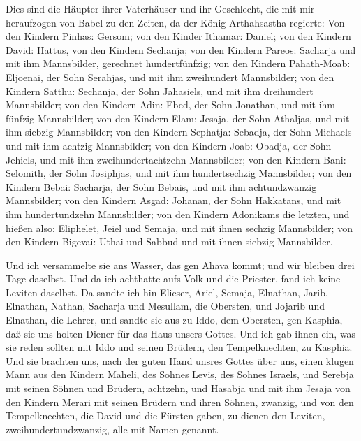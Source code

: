  Dies sind die Häupter ihrer Vaterhäuser und ihr Geschlecht,
die mit mir heraufzogen von Babel zu den Zeiten, da der König
Arthahsastha regierte:  Von den Kindern Pinhas: Gersom; von
den Kinder Ithamar: Daniel; von den Kindern David: Hattus, 
von den Kindern Sechanja; von den Kindern Pareos: Sacharja und mit ihm
Mannsbilder, gerechnet hundertfünfzig;  von den Kindern
Pahath-Moab: Eljoenai, der Sohn Serahjas, und mit ihm zweihundert
Mannsbilder;  von den Kindern Satthu: Sechanja, der Sohn
Jahasiels, und mit ihm dreihundert Mannsbilder;  von den
Kindern Adin: Ebed, der Sohn Jonathan, und mit ihm fünfzig Mannsbilder;
 von den Kindern Elam: Jesaja, der Sohn Athaljas, und mit
ihm siebzig Mannsbilder;  von den Kindern Sephatja: Sebadja,
der Sohn Michaels und mit ihm achtzig Mannsbilder;  von den
Kindern Joab: Obadja, der Sohn Jehiels, und mit ihm zweihundertachtzehn
Mannsbilder;  von den Kindern Bani: Selomith, der Sohn
Josiphjas, und mit ihm hundertsechzig Mannsbilder;  von den
Kindern Bebai: Sacharja, der Sohn Bebais, und mit ihm achtundzwanzig
Mannsbilder;  von den Kindern Asgad: Johanan, der Sohn
Hakkatans, und mit ihm hundertundzehn Mannsbilder;  von den
Kindern Adonikams die letzten, und hießen also: Eliphelet, Jeiel und
Semaja, und mit ihnen sechzig Mannsbilder;  von den Kindern
Bigevai: Uthai und Sabbud und mit ihnen siebzig Mannsbilder.

 Und ich versammelte sie ans Wasser, das gen Ahava kommt;
und wir bleiben drei Tage daselbst. Und da ich achthatte aufs Volk und
die Priester, fand ich keine Leviten daselbst.  Da sandte
ich hin Elieser, Ariel, Semaja, Elnathan, Jarib, Elnathan, Nathan,
Sacharja und Mesullam, die Obersten, und Jojarib und Elnathan, die
Lehrer,  und sandte sie aus zu Iddo, dem Obersten, gen
Kasphia, daß sie uns holten Diener für das Haus unsers Gottes. Und ich
gab ihnen ein, was sie reden sollten mit Iddo und seinen Brüdern, den
Tempelknechten, zu Kasphia.  Und sie brachten uns, nach der
guten Hand unsres Gottes über uns, einen klugen Mann aus den Kindern
Maheli, des Sohnes Levis, des Sohnes Israels, und Serebja mit seinen
Söhnen und Brüdern, achtzehn,  und Hasabja und mit ihm
Jesaja von den Kindern Merari mit seinen Brüdern und ihren Söhnen,
zwanzig,  und von den Tempelknechten, die David und die
Fürsten gaben, zu dienen den Leviten, zweihundertundzwanzig, alle mit
Namen genannt.

